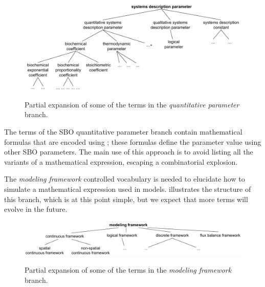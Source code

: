 \begin{figure}[tbh]
  \centering
  \vspace{-2ex}
             {\includegraphics[scale=0.8]{figs/sbo-quantitative-parameter-l3v2}}
  \caption{Partial expansion of some of the terms in the
    \emph{quantitative parameter} branch.}
  \label{fig:expanded-parameter}
\end{figure}

The terms of the SBO quantitative  parameter branch contain
mathematical formulas that are encoded using \mathmltwo; these
formulas define the parameter value using other SBO parameters.
The main use of this approach is to avoid listing all the variants
of a mathematical expression, escaping a combinatorial explosion.

The \emph{modeling framework} controlled vocabulary is needed to
elucidate how to simulate a mathematical expression used in models.
 illustrates the structure of
this branch, which is at this point   simple, but we
expect that more terms will evolve in the future.

\begin{figure}[tbh]
  \centering
  \vspace{-1ex}
             {\includegraphics[scale=0.8]{figs/sbo-framework-l3v2}}
  \caption{Partial expansion of some of the terms in the
    \emph{modeling framework} branch.}
  \label{fig:expanded-framework}
\end{figure}

